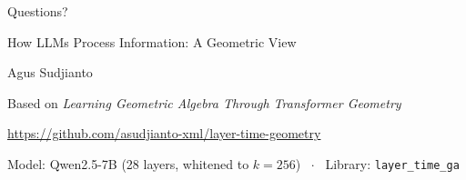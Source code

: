 \documentclass[aspectratio=169, 11pt]{beamer}
\begin{document}
{
\begin{frame}[plain, c]
\begin{center}
{\Huge Questions?}

\vspace{0.8em}
{\large How LLMs Process Information: A Geometric View}

\vspace{0.4em}
{\small Agus Sudjianto}

\vspace{0.4em}
{\scriptsize Based on \emph{Learning Geometric Algebra Through Transformer Geometry}}

\vspace{0.2em}
{\scriptsize\url{https://github.com/asudjianto-xml/layer-time-geometry}}

\vspace{0.4em}
{\scriptsize
Model: Qwen2.5-7B (28 layers, whitened to $k = 256$) ~$\cdot$~
Library: \texttt{layer\_time\_ga}}
\end{center}
\end{frame}
}
\end{document}
